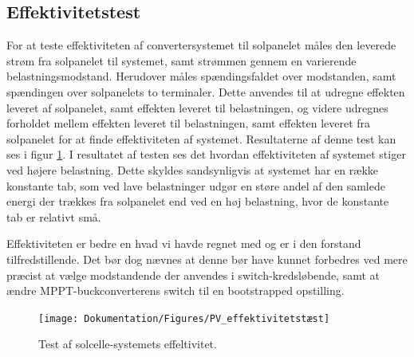 \documentclass[../main.tex]{subfiles}
\begin{document}
\subsection{Effektivitetstest}
For at teste effektiviteten af convertersystemet til solpanelet måles den leverede strøm fra solpanelet til systemet, samt strømmen gennem en varierende belastningsmodstand. Herudover måles spændingsfaldet over modstanden, samt spændingen over solpanelets to terminaler. Dette anvendes til at udregne effekten leveret af solpanelet, samt effekten leveret til belastningen, og videre udregnes forholdet mellem effekten leveret til belastningen, samt effekten leveret fra solpanelet 
for at finde effektiviteten af systemet. Resultaterne af denne test kan ses i figur \ref{fig: Test af solcelle-systemets effektivitet}.\newline
I resultatet af testen ses det hvordan effektiviteten af systemet stiger ved højere belastning. Dette skyldes sandsynligvis at systemet har en række konstante tab, som ved lave belastninger udgør en støre andel af den samlede energi der trækkes fra solpanelet end ved en høj belastning, hvor de konstante tab er relativt små.\newline

Effektiviteten er bedre en hvad vi havde regnet med og er i den forstand tilfredstillende. Det bør dog nævnes at denne bør have kunnet forbedres ved mere præcist at vælge modstandende der anvendes i switch-kredsløbende, samt at ændre MPPT-buckconverterens switch til en bootstrapped opstilling.
    \begin{figure}[H]
        \texttt{[image: Dokumentation/Figures/PV\_effektivitetstæst]}
        \caption{Test af solcelle-systemets effeltivitet.}
        \label{fig: Test af solcelle-systemets effektivitet}
        \end{figure}

        
\end{document}
